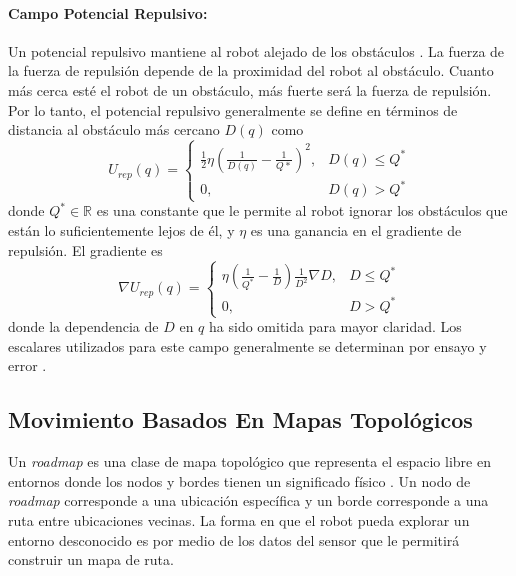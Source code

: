 \paragraph{Campo Potencial Repulsivo:}
Un potencial repulsivo mantiene al robot alejado de los obstáculos 
\cite{koren1991potential}. La fuerza de la fuerza de repulsión depende de la 
proximidad del robot al obstáculo. Cuanto más cerca esté el robot de un 
obstáculo, más fuerte será la fuerza de repulsión. Por lo tanto, el 
potencial repulsivo generalmente se define en términos de distancia al 
obstáculo más cercano $D(q)$ como 
\begin{equation}
U_{rep}(q) =
\begin{cases}
	\frac{1}{2}\eta(\frac{1}{D(q)} - \frac{1}{Q*})^2, & D(q)\leq Q^* \\
	0, & D(q) > Q^*
\end{cases}
\label{eq:pot_rep}
\end{equation}
donde $Q^* \in \mathbb R$ es una constante que le permite al robot ignorar 
los obst\'aculos que est\'an lo suficientemente lejos de \'el, y $\eta$ es 
una ganancia en el gradiente de repulsi\'on. El gradiente es 
\begin{equation}
\nabla U_{rep}(q) =
\begin{cases}
	\eta(\frac{1}{Q^*} - \frac{1}{D})\frac{1}{D^2} \nabla D, & D \leq Q^* \\
	0, & D > Q^*
\end{cases}
\label{eqn:gradient_rep}
\end{equation}
donde la dependencia de $D$ en $q$ ha sido omitida para mayor claridad. Los 
escalares utilizados para este campo generalmente se determinan por ensayo 
y error \cite{choset2005principles}.

\subsection{Movimiento Basados En Mapas Topológicos} %

Un \textit{roadmap} es una clase de mapa topológico que representa el 
espacio libre en entornos donde los nodos y bordes tienen un significado 
físico \cite{choset2005RoadMap}. Un nodo de \textit{roadmap} corresponde a una 
ubicación específica y un borde corresponde a una ruta entre ubicaciones 
vecinas. La forma en que el robot pueda explorar un entorno desconocido es 
por medio de los datos del sensor que le permitirá construir un mapa de ruta.

